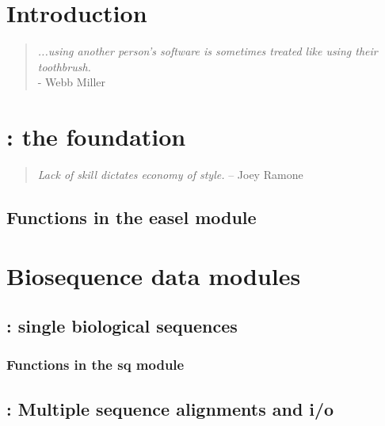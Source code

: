 \documentclass[10pt]{book}
\begin{document}


\newpage
\tableofcontents

\sloppy

\newpage
\chapter{Introduction}
\begin{quote}
 \emph{...using another person's software is sometimes treated like 
 using their toothbrush.}\\
\hspace*{1em}\hfill - Webb Miller \citep{Miller01}
\end{quote}



\newpage
\chapter{: the foundation}
\begin{quote}
\emph{Lack of skill dictates economy of style.} 
\hspace*{1em}\hfill -- Joey Ramone
\end{quote}     

\section{Functions in the easel module}

\vspace*{\fill}


\chapter{Biosequence data modules}

\newpage
\section{: single biological sequences}

\subsection{Functions in the sq module}


\newpage
\section{: Multiple sequence alignments and i/o}

\end{document}
